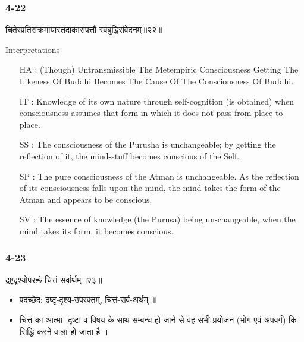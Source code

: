 \begin{frame}[fragile]\frametitle{4-22}
\begin{sanskrit}
चितेरप्रतिसंक्रमायास्तदाकारापत्तौ स्वबुद्धिसंवेदनम्॥२२॥
\end{sanskrit}

Interpretations
\begin{itemize}	
\item [HA]: (Though) Untransmissible The Metempiric Consciousness Getting The Likeness Of Buddhi Becomes The Cause Of The Consciousness Of Buddhi.
\item [IT]: Knowledge of its own nature through self-cognition (is obtained) when consciousness assumes that form in which it does not pass from place to place.
\item [SS]: The consciousness of the Purusha is unchangeable; by getting the reflection of it, the mind-stuff becomes conscious of the Self.
\item [SP]: The pure consciousness of the Atman is unchangeable. As the reflection of its consciousness falls upon the mind, the mind takes the form of the Atman and appears to be conscious.
\item [SV]: The essence of knowledge (the Purusa) being un-changeable, when the mind takes its form, it becomes conscious.
\end{itemize}
\end{frame}

\begin{frame}[fragile]\frametitle{4-23}
\begin{sanskrit}
द्रष्टृदृश्योपरक्तं चित्तं सर्वार्थम्॥२३॥
\end{sanskrit}

\begin{itemize}
\item पदच्छेद:  ‌द्रष्टृ-दृश्य-उपरक्तम्, चित्तं-सर्व-अर्थम् ॥
\item  चित्त का आत्मा -दृष्टा व विषय के साथ सम्बन्ध हो जाने से वह सभी प्रयोजन (भोग एवं अपवर्ग) कि सिद्धि करने वाला हो जाता है ।
\end{itemize}
\end{frame}

